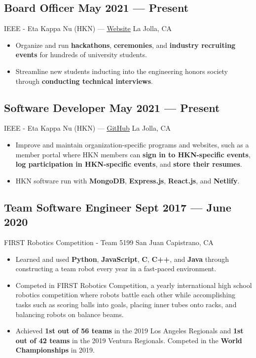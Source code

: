 \documentclass[a4,10pt]{article}
\newcommand{\subtext}[1]{
#1\par\vspace{-0.2cm}}
\newenvironment{zitemize}{
\begin{itemize}\itemsep0pt \parskip0pt \parsep1pt}
{\end{itemize}\vspace{-0.5cm}}
\begin{document}
\subsection*{Board Officer \hfill May 2021 --- Present} 
\subtext{IEEE - Eta Kappa Nu (HKN) —  {{\href{https://hkn.ucsd.edu}{\underline{\textcolor{linkblue}{Website}}}}} \hfill La Jolla, CA} 
\vspace{-.1cm}
    \begin{zitemize}
        \item Organize and run \textbf{hackathons}, \textbf{ceremonies}, and \textbf{industry recruiting events} for hundreds of university students.
        \item Streamline new students inducting into the engineering honors society through \textbf{conducting technical interviews}.
    \end{zitemize}

\subsection*{Software Developer \hfill May 2021 --- Present} 
\subtext{IEEE - Eta Kappa Nu (HKN) —  {\normalsize\normalfont \href{https://github.com/HKN-UCSD/}{{\underline{\textcolor{linkblue}{GitHub}}}}} \hfill La Jolla, CA} 
\vspace{-.1cm}
    \begin{zitemize}
        \item Improve and maintain organization-specific programs and websites, such as a member portal where HKN members can \textbf{sign in to HKN-specific events}, \textbf{log participation in HKN-specific events}, and \textbf{store their resumes}.
        \item HKN software run with \textbf{MongoDB}, \textbf{Express.js}, \textbf{React.js}, and \textbf{Netlify}.
    \end{zitemize}


\subsection*{Team Software Engineer \hfill Sept 2017 --- June 2020} 
\subtext{FIRST Robotics Competition - Team 5199 \hfill San Juan Capistrano, CA} 
\vspace{-.1cm}
    \begin{zitemize}
        \item Learned and used \textbf{Python}, \textbf{JavaScript}, \textbf{C}, \textbf{C++}, and \textbf{Java} through constructing a team robot every year in a fast-paced environment.
        \item Competed in FIRST Robotics Competition, a yearly international high school robotics competition where robots battle each other while accomplishing tasks such as scoring balls into goals, placing inner tubes onto racks, and balancing robots on balance beams.
        \item Achieved \textbf{1st out of 56 teams} in the 2019 Los Angeles Regionals and \textbf{1st out of 42 teams} in the 2019 Ventura Regionals. Competed in the \textbf{World Championships} in 2019.
    \end{zitemize}
\end{document}
